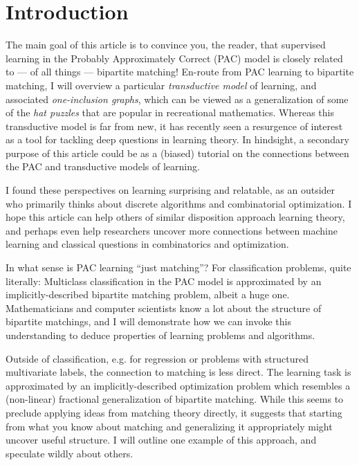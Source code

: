 \section{Introduction}
The main goal of this article is to convince you, the reader, that supervised learning in the Probably Approximately Correct (PAC) model is closely related to --- of all things --- bipartite matching! %
\mbox{En-route} from PAC learning to bipartite matching, I will overview a particular \emph{transductive model} of learning, and associated \emph{one-inclusion graphs}, which can be viewed as a generalization of some of the \emph{hat puzzles} that are popular in recreational mathematics. Whereas this transductive model is far from new, it has recently seen a resurgence of interest as a tool for tackling deep questions in learning theory. In hindsight, a secondary purpose of this article could be as a (biased) tutorial on the connections between the PAC and transductive models of learning.
%

I found these perspectives on learning surprising and relatable, as an outsider who primarily thinks about discrete algorithms and combinatorial optimization.
I hope this article  can help others of similar disposition approach learning theory, and perhaps even help researchers uncover more connections between machine learning and classical questions in combinatorics and optimization.

In what sense is PAC learning ``just matching''? For classification problems, quite literally: Multiclass classification in the PAC model is approximated by an implicitly-described bipartite matching problem, albeit a huge one. %
Mathematicians and computer scientists know a lot about the structure of bipartite matchings, and I will demonstrate how we can invoke this understanding to deduce properties of learning problems and algorithms.

Outside of classification, e.g. for regression or problems with structured multivariate labels, the connection to matching is less direct. The learning task is approximated by an implicitly-described optimization problem which resembles a (non-linear) fractional generalization of bipartite matching. While this seems to preclude applying ideas from matching theory directly, it suggests that starting from what you know about matching and generalizing it appropriately might uncover useful structure. I will outline one example of this approach, and speculate wildly  about others.



